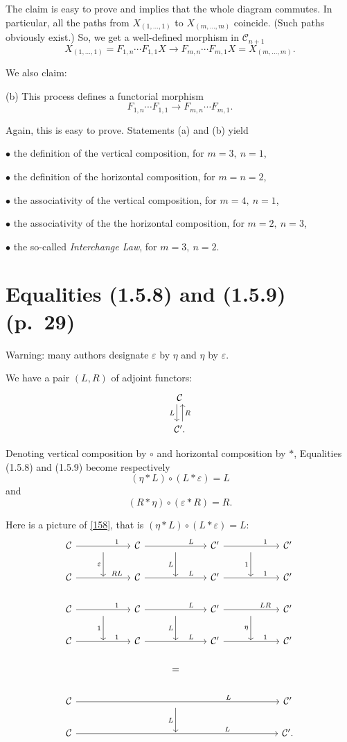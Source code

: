 \documentclass[12pt]{article}
\theoremstyle{remark}%
\newcommand{\bu}{\bullet}
\newcommand{\n}{\noindent}
\newcommand{\C}{\mathcal C}
\newcommand{\e}{\varepsilon}
\newcommand{\be}{\begin{equation}}
\newcommand{\ee}{\end{equation}}
\begin{document}
The claim is easy to prove and implies that the whole diagram commutes. In particular, all the paths from $X_{(1,\dots,1)}$ to $X_{(m,\dots,m)}$ coincide. (Such paths obviously exist.) So, we get a well-defined morphism in $\C_{n+1}$
$$
X_{(1,\dots,1)}=F_{1,n}\cdots F_{1,1}X\to F_{m,n}\cdots F_{m,1}X=X_{(m,\dots,m)}.
$$

We also claim: 

\n(b) This process defines a functorial morphism 
$$
F_{1,n}\cdots F_{1,1}\to F_{m,n}\cdots F_{m,1}.
$$

Again, this is easy to prove. Statements (a) and (b) yield 

\n$\bu$ the definition of the vertical composition, for $m=3,\ n=1$,

\n$\bu$ the definition of the horizontal composition, for $m=n=2$,

\n$\bu$ the associativity of the vertical composition, for $m=4,\ n=1$,

\n$\bu$ the associativity of the the horizontal composition, for $m=2,\ n=3$,

\n$\bu$ the so-called \emph{Interchange Law}, for $m=3,\ n=2$.
%
\section{Equalities (1.5.8) and (1.5.9) (p.~29)} %
%
Warning: many authors designate $\e$ by $\eta$ and $\eta$ by $\e$. 

We have a pair $(L,R)$ of adjoint functors: 
$$
\begin{tikzcd}
\C\ar[xshift=-.7ex]{d}[swap]{L}\\ 
\C'.\ar[xshift=.7ex]{u}[swap]{R}
\end{tikzcd}
$$

Denoting vertical composition by $\circ$ and horizontal composition by $*$, Equalities (1.5.8) and (1.5.9) become respectively 
%
\be\label{158} 
(\eta*L)\circ(L*\e)=L
\ee 
% 
and 
%
\be\label{159} 
(R*\eta)\circ(\e*R)=R.
\ee 
% 

Here is a picture of \eqref{158}, that is $(\eta*L)\circ(L*\e)=L$: 
$$
\begin{tikzcd}
%
\C\ar{rr}{}[near end]{1}&\ar{d}[swap]{\e}&\C\ar{rr}{}[near end]{L}&\ar{d}[swap]{L}&\C'\ar{rr}{}[near end]{1}&\ar{d}[swap]{1}&\C'\\ 
%
\C\ar{rr}{}[near end]{RL}&{}&\C\ar{rr}{}[near end]{L}&{}&\C'\ar{rr}{}[near end]{1}&{}&\C'\\ 
%
\C\ar{rr}{}[near end]{1}&\ar{d}[swap]{1}&\C\ar{rr}{}[near end]{L}&\ar{d}[swap]{L}&\C'\ar{rr}{}[near end]{LR}&\ar{d}[swap]{\eta}&\C'\\ 
%
\C\ar{rr}{}[near end]{1}&{}&\C\ar{rr}{}[near end]{L}&{}&\C'\ar{rr}{}[near end]{1}&{}&\C'\\ 
%
&&&=\\ 
%
\C\ar{rrrrrr}[near end]{L}&&&{}\ar{d}[swap]{L}&&&\C'\\
%
\C\ar{rrrrrr}[near end]{L}&&&{}&&&\C'.
%
\end{tikzcd}
$$ 
\end{document}
